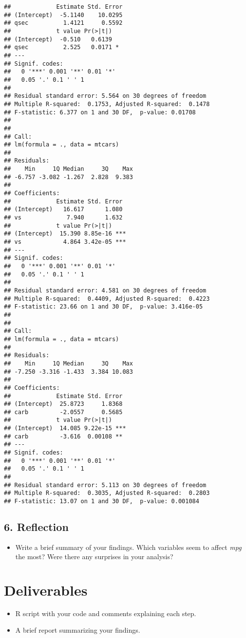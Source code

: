 \documentclass[11pt]{article}\usepackage[]{graphicx}\usepackage[]{xcolor}
\makeatletter
\newenvironment{kframe}{%
 \def\at@end@of@kframe{}%
 \ifinner\ifhmode%
  \def\at@end@of@kframe{\end{minipage}}%
  \begin{minipage}{\columnwidth}%
 \fi\fi%
 \def\FrameCommand##1{\hskip\@totalleftmargin \hskip-\fboxsep
 \colorbox{shadecolor}{##1}\hskip-\fboxsep
     \hskip-\linewidth \hskip-\@totalleftmargin \hskip\columnwidth}%
 \MakeFramed {\advance\hsize-\width
   \@totalleftmargin\z@ \linewidth\hsize
   \@setminipage}}%
 {\par\unskip\endMakeFramed%
 \at@end@of@kframe}
\newenvironment{knitrout}{}{} %
\makeatother
\begin{document}
\begin{knitrout}
\begin{kframe}
\begin{verbatim}
##             Estimate Std. Error
## (Intercept)  -5.1140    10.0295
## qsec          1.4121     0.5592
##             t value Pr(>|t|)  
## (Intercept)  -0.510   0.6139  
## qsec          2.525   0.0171 *
## ---
## Signif. codes:  
##   0 '***' 0.001 '**' 0.01 '*'
##   0.05 '.' 0.1 ' ' 1
## 
## Residual standard error: 5.564 on 30 degrees of freedom
## Multiple R-squared:  0.1753,	Adjusted R-squared:  0.1478 
## F-statistic: 6.377 on 1 and 30 DF,  p-value: 0.01708
## 
## 
## Call:
## lm(formula = ., data = mtcars)
## 
## Residuals:
##    Min     1Q Median     3Q    Max 
## -6.757 -3.082 -1.267  2.828  9.383 
## 
## Coefficients:
##             Estimate Std. Error
## (Intercept)   16.617      1.080
## vs             7.940      1.632
##             t value Pr(>|t|)    
## (Intercept)  15.390 8.85e-16 ***
## vs            4.864 3.42e-05 ***
## ---
## Signif. codes:  
##   0 '***' 0.001 '**' 0.01 '*'
##   0.05 '.' 0.1 ' ' 1
## 
## Residual standard error: 4.581 on 30 degrees of freedom
## Multiple R-squared:  0.4409,	Adjusted R-squared:  0.4223 
## F-statistic: 23.66 on 1 and 30 DF,  p-value: 3.416e-05
## 
## 
## Call:
## lm(formula = ., data = mtcars)
## 
## Residuals:
##    Min     1Q Median     3Q    Max 
## -7.250 -3.316 -1.433  3.384 10.083 
## 
## Coefficients:
##             Estimate Std. Error
## (Intercept)  25.8723     1.8368
## carb         -2.0557     0.5685
##             t value Pr(>|t|)    
## (Intercept)  14.085 9.22e-15 ***
## carb         -3.616  0.00108 ** 
## ---
## Signif. codes:  
##   0 '***' 0.001 '**' 0.01 '*'
##   0.05 '.' 0.1 ' ' 1
## 
## Residual standard error: 5.113 on 30 degrees of freedom
## Multiple R-squared:  0.3035,	Adjusted R-squared:  0.2803 
## F-statistic: 13.07 on 1 and 30 DF,  p-value: 0.001084
\end{verbatim}
\end{kframe}
\end{knitrout}
\clearpage
\subsection*{6. Reflection}
\begin{itemize}
    \item Write a brief summary of your findings. Which variables seem to affect \textit{mpg} the most? Were there any surprises in your analysis?
\end{itemize}

\section*{Deliverables}
\begin{itemize}
    \item R script with your code and comments explaining each step.
    \item A brief report summarizing your findings.
\end{itemize}
\end{document}
